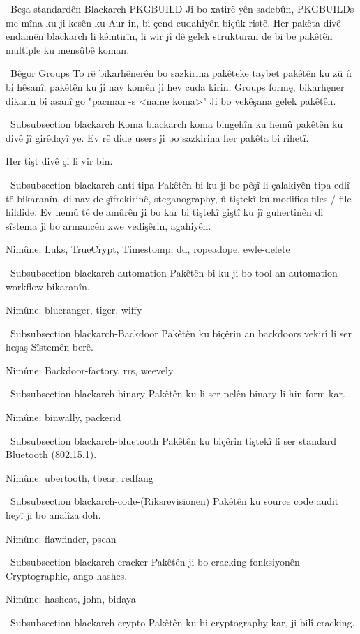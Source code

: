 \ Beşa {standardên Blackarch PKGBUILD}
Ji bo xatirê yên sadebûn, PKGBUILDs me mîna ku ji kesên ku Aur in,
bi çend cudahiyên biçûk ristê. Her pakêta divê
endamên blackarch li kêmtirîn, li wir jî dê gelek strukturan de bi be
pakêtên multiple ku mensûbê koman.

\ Bêgor {Groups}
To rê bikarhênerên bo sazkirina pakêteke taybet pakêtên ku zû û bi hêsanî,
pakêtên ku ji nav komên ji hev cuda kirin. Groups formę, bikarhęner dikarin bi asanî
go "pacman -s <name koma>" Ji bo vekêşana gelek pakêtên.

\ Subsubsection {blackarch}
Koma blackarch koma bingehîn ku hemû pakêtên ku divê jî girêdayî ye. Ev rê dide
users ji bo sazkirina her pakêta bi rihetî.

Her tişt divê çi li vir bin.

\ Subsubsection {blackarch-anti-tipa}
Pakêtên bi ku ji bo pêşî li çalakiyên tipa edlî tê bikaranîn,
di nav de şîfrekirinê, steganography, û tiştekî ku modifies files / file hildide.
Ev hemû tê de amûrên ji bo kar bi tiştekî giştî ku jî guhertinên di sîstema
ji bo armancên xwe vedişêrin, agahiyên.

Nimûne: Luks, TrueCrypt, Timestomp, dd, ropeadope, ewle-delete

\ Subsubsection {blackarch-automation}
Pakêtên bi ku ji bo tool an automation workflow bikaranîn.

Nimûne: blueranger, tiger, wiffy

\ Subsubsection {blackarch-Backdoor}
Pakêtên ku biçêrin an backdoors vekirî li ser heşaş Sîstemên berê.

Nimûne: Backdoor-factory, rrs, weevely

\ Subsubsection {blackarch-binary}
Pakêtên ku li ser pelên binary li hin form kar.

Nimûne: binwally, packerid

\ Subsubsection {blackarch-bluetooth}
Pakêtên ku biçêrin tiştekî li ser standard Bluetooth (802.15.1).

Nimûne: ubertooth, tbear, redfang

\ Subsubsection {blackarch-code-(Riksrevisionen)}
Pakêtên ku source code audit heyî ji bo analîza doh.

Nimûne: flawfinder, pscan

\ Subsubsection {blackarch-cracker}
Pakêtên ji bo cracking fonksiyonên Cryptographic, ango hashes.

Nimûne: hashcat, john, bidaya

\ Subsubsection {blackarch-crypto}
Pakêtên ku bi cryptography kar, ji bilî cracking.

